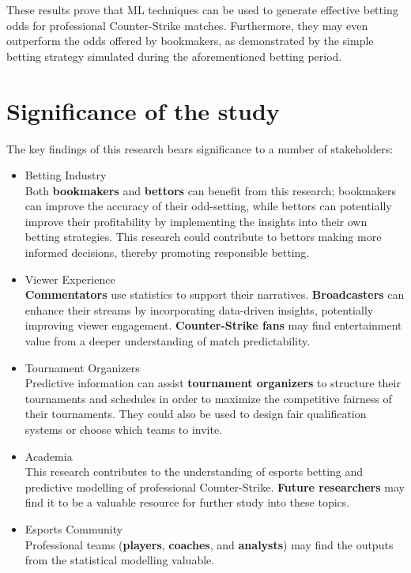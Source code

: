 These results prove that ML techniques can be used to generate effective betting odds for professional Counter-Strike matches. Furthermore, they may even outperform the odds offered by bookmakers, as demonstrated by the simple betting strategy simulated during the aforementioned betting period.

\section{Significance of the study}

The key findings of this research bears significance to a number of stakeholders:
\begin{itemize}
	\item Betting Industry\\
	Both \textbf{bookmakers} and \textbf{bettors} can benefit from this research; bookmakers can improve the accuracy of their odd-setting, while bettors can potentially improve their profitability by implementing the insights into their own betting strategies. This research could contribute to bettors making more informed decisions, thereby promoting responsible betting.
	\item Viewer Experience\\\textbf{Commentators} use statistics to support their narratives. \textbf{Broadcasters} can enhance their streams by incorporating data-driven insights, potentially improving viewer engagement. \textbf{Counter-Strike fans} may find entertainment value from a deeper understanding of match predictability.
	\item Tournament Organizers\\
	Predictive information can assist \textbf{tournament organizers} to structure their tournaments and schedules in order to maximize the competitive fairness of their tournaments. They could also be used to design fair qualification systems or choose which teams to invite.
	\item Academia\\
	This research contributes to the understanding of esports betting and predictive modelling of professional Counter-Strike. \textbf{Future researchers} may find it to be a valuable resource for further study into these topics.
	\item Esports Community\\
	Professional teams (\textbf{players}, \textbf{coaches}, and \textbf{analysts}) may find the outputs from the statistical modelling valuable.
	
\end{itemize}

